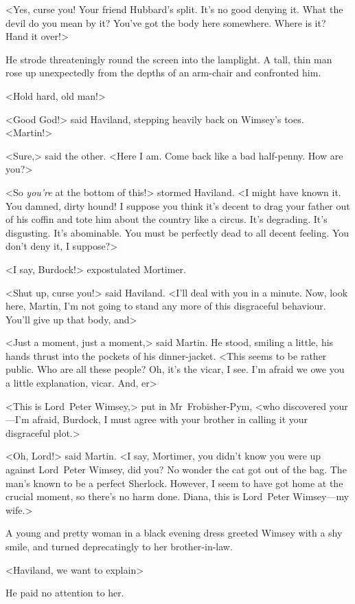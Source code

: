 <Yes, curse you! Your friend Hubbard's split. It's no good denying it. What the devil do you mean by it? You've got the body here somewhere. Where is it? Hand it over!>

He strode threateningly round the screen into the lamplight. A tall, thin man rose up unexpectedly from the depths of an arm-chair and confronted him.

<Hold hard, old man!>

<Good God!> said Haviland, stepping heavily back on Wimsey's toes. <Martin!>

<Sure,> said the other. <Here I am. Come back like a bad half-penny. How are you?>

<So \emph{you're} at the bottom of this!> stormed Haviland. <I might have known it. You damned, dirty hound! I suppose you think it's decent to drag your father out of his coffin and tote him about the country like a circus. It's degrading. It's disgusting. It's abominable. You must be perfectly dead to all decent feeling. You don't deny it, I suppose?>

<I say, Burdock!> expostulated Mortimer.

<Shut up, curse you!> said Haviland. <I'll deal with you in a minute. Now, look here, Martin, I'm not going to stand any more of this disgraceful behaviour. You'll give up that body, and\longdash>

<Just a moment, just a moment,> said Martin. He stood, smiling a little, his hands thrust into the pockets of his dinner-jacket. <This  seems to be rather public. Who are all these people? Oh, it's the vicar, I see. I'm afraid we owe you a little explanation, vicar. And, er\longdash>

<This is Lord~Peter Wimsey,> put in Mr~Frobisher-Pym, <who discovered your—I'm afraid, Burdock, I must agree with your brother in calling it your disgraceful plot.>

<Oh, Lord!> said Martin. <I say, Mortimer, you didn't know you were up against Lord~Peter Wimsey, did you? No wonder the cat got out of the bag. The man's known to be a perfect Sherlock. However, I seem to have got home at the crucial moment, so there's no harm done. Diana, this is Lord~Peter Wimsey—my wife.>

A young and pretty woman in a black evening dress greeted Wimsey with a shy smile, and turned deprecatingly to her brother-in-law.

<Haviland, we want to explain\longdash>

He paid no attention to her.

